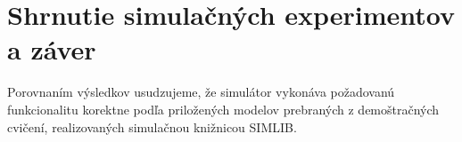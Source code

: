 \documentclass[11pt, a4paper, titlepage]{article}
\begin{document}
%

\section{Shrnutie simulačných experimentov a záver}
Porovnaním výsledkov usudzujeme, že simulátor vykonáva požadovanú funkcionalitu korektne podľa priložených modelov prebraných z demoštračných cvičení, realizovaných simulačnou knižnicou SIMLIB.
%

\newpage

%


\renewcommand{\refname}{Literatúra}


\end{document}
